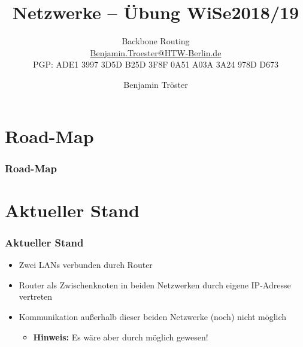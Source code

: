 \documentclass[xcolor=dvipsnames, aspectratio=169]{beamer}
\begin{document}

\title{Netzwerke -- Übung WiSe2018/19}
\subtitle{Backbone Routing\\
		\href{mailto:Benjamin.Troester@HTW-Berlin.de}{Benjamin.Troester@HTW-Berlin.de}\\
		PGP: ADE1 3997 3D5D B25D 3F8F 0A51 A03A 3A24 978D D673 }
\author{Benjamin Tröster}

\date{}

\begin{frame}
\titlepage

\end{frame}

\section*{Road-Map}
\begin{frame}
\frametitle{Road-Map}
\begin{multicols}{2}
  \tableofcontents
\end{multicols}
\end{frame}

\section{Aktueller Stand}
\begin{frame}
	\frametitle{Aktueller Stand}
	\begin{itemize}
		\item Zwei LANs verbunden durch Router
		\item Router als Zwischenknoten in beiden Netzwerken durch eigene IP-Adresse vertreten
		\item Kommunikation außerhalb dieser beiden Netzwerke (noch) nicht möglich
		\begin{itemize}
			\item \textbf{Hinweis:} Es wäre aber durch möglich gewesen!
		\end{itemize}
	\end{itemize}
\end{frame}
\end{document}
